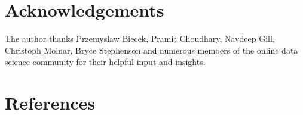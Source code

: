 \documentclass{article}
\begin{document}
\section*{Acknowledgements}

The author thanks Przemyslaw Biecek, Pramit Choudhary, Navdeep Gill, Christoph Molnar, Bryce Stephenson and numerous members of the online data science community for their helpful input and insights. 

\section*{References}
\small


\end{document}
